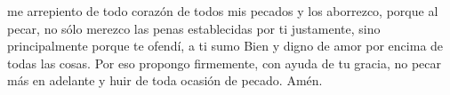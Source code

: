 me arrepiento de todo corazón de todos mis pecados y los aborrezco, porque al pecar, no sólo merezco las penas establecidas 
por ti justamente, sino principalmente porque te ofendí, a ti sumo Bien y digno de amor por encima de todas las cosas. Por eso propongo firmemente, 
con ayuda de tu gracia, no pecar más en adelante y huir de toda ocasión de pecado. Amén.